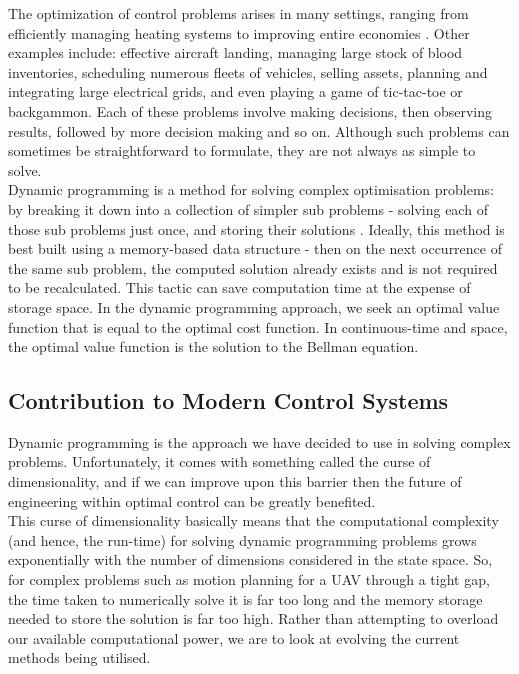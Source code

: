 \documentclass[11pt,draftd]{article}
\begin{document}
\noindent The optimization of control problems arises in many settings, ranging from efficiently managing heating systems to improving entire economies \cite{powell}. Other examples include: effective aircraft landing, managing large stock of blood inventories, scheduling numerous fleets of vehicles, selling assets, planning and integrating large electrical grids, and even playing a game of tic-tac-toe or backgammon. Each of these problems involve making decisions, then observing results, followed by more decision making and so on. Although such problems can sometimes be straightforward to formulate, they are not always as simple to solve. \\

\noindent Dynamic programming is a method for solving complex optimisation problems: by breaking it down into a collection of simpler sub problems - solving each of those sub problems just once, and storing their solutions \cite{wikiDyn}. Ideally, this method is best built using a memory-based data structure - then on the next occurrence of the same sub problem, the computed solution already exists and is not required to be recalculated. This tactic can save computation time at the expense of storage space. In the dynamic programming approach, we seek an optimal value function that is equal to the optimal cost function. In continuous-time and space, the optimal value function is the solution to the Bellman equation. \\

\subsection{Contribution to Modern Control Systems}
\noindent Dynamic programming is the approach we have decided to use in solving complex problems. Unfortunately, it comes with something called the curse of dimensionality, and if we can improve upon this barrier then the future of engineering within optimal control can be greatly benefited. \\

\noindent This curse of dimensionality basically means that the computational complexity (and hence, the run-time) for solving dynamic programming problems grows exponentially with the number of dimensions considered in the state space. So, for complex problems such as motion planning for a UAV through a tight gap, the time taken to numerically solve it is far too long and the memory storage needed to store the solution is far too high. Rather than attempting to overload our available computational power, we are to look at evolving the current methods being utilised. \\
\end{document}
